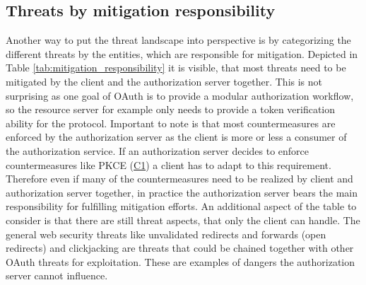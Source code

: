\documentclass[
    fontsize=12pt,
    headings=small,
    parskip=half,           %
    bibliography=totoc,
    numbers=noenddot,       %
    open=any,               %
    ]{scrreprt}
\begin{document}
\subsection{Threats by mitigation responsibility}
Another way to put the threat landscape into perspective is by categorizing the different threats by the entities, which are responsible for mitigation. Depicted in Table \ref{tab:mitigation_responsibility} it is visible, that most threats need to be mitigated by the client and the authorization server together. This is not surprising as one goal of OAuth is to provide a modular authorization workflow, so the resource server for example only needs to provide a token verification ability for the protocol. Important to note is that most countermeasures are enforced by the authorization server as the client is more or less a consumer of the authorization service. If an authorization server decides to enforce countermeasures like PKCE (\hyperref[counter:C1]{C1}) a client has to adapt to this requirement. Therefore even if many of the countermeasures need to be realized by client and authorization server together, in practice the authorization server bears the main responsibility for fulfilling mitigation efforts. An additional aspect of the table to consider is that there are still threat aspects, that only the client can handle. The general web security threats like unvalidated redirects and forwards (open redirects) and clickjacking are threats that could be chained together with other OAuth threats for exploitation. These are examples of dangers the authorization server cannot influence.
\end{document}
